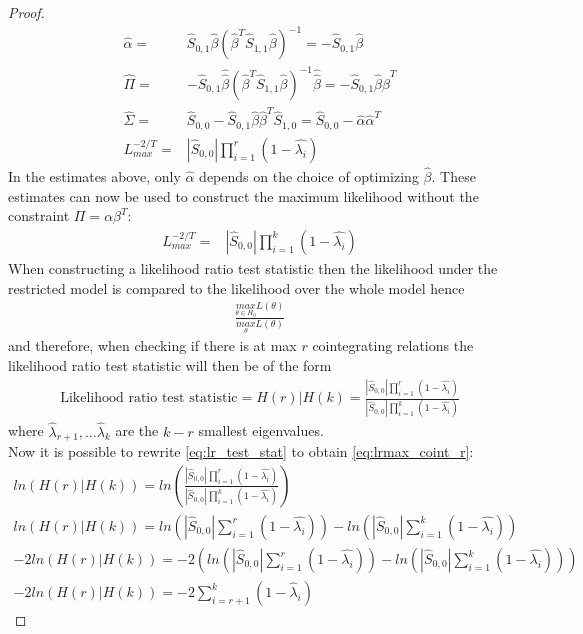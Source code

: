 \begin{proof}
\begin{align*}
    \hat{\alpha}=&\hat{S}_{0,1}\hat{\beta}(\hat{\beta}^T \hat{S}_{1,1}\hat{\beta})^{-1}=-\hat{S}_{0,1}\hat{\beta}\\
    \hat{\Pi}=&-\hat{S}_{0,1}\hat{\hat{\beta}}(\hat{\beta}^T \hat{S}_{1,1}\hat{\beta})^{-1}\hat{\hat{\beta}}=-\hat{S}_{0,1}\hat{\beta}\hat{\beta}^T\\
    \hat{\Sigma}=&\hat{S}_{0,0}-\hat{S}_{0,1}\hat{\beta}\hat{\beta}^T\hat{S}_{1,0}=\hat{S}_{0,0}-\hat{\alpha}\hat{\alpha}^T\\
    L_{max}^{-2/T}=&|\hat{S}_{0,0}|\prod_{i=1}^r(1-\hat{\lambda_i})
\end{align*}
In the estimates above, only $\hat{\alpha}$ depends on the choice of optimizing $\hat{\beta}$. These estimates can now be used to construct the maximum likelihood without the constraint $\Pi=\alpha\beta^T$:
\begin{align*}
    L_{max}^{-2/T}=&|\hat{S}_{0,0}|\prod_{i=1}^k(1-\hat{\lambda_i})
\end{align*}
When constructing a likelihood ratio test statistic then the likelihood under the restricted model is compared to the likelihood over the whole model hence
\begin{align*}
    \frac{\underset{\theta\in H_0}{max}L(\theta)}{\underset{\theta}{max}L(\theta)}
\end{align*}
and therefore, when checking if there is at max $r$ cointegrating relations the likelihood ratio test statistic will then be of the form
\begin{align}\label{eq:lr_test_stat}
\text{Likelihood ratio test statistic}=H(r)|H(k)=\frac{|\hat{S}_{0,0}|\prod_{i=1}^r (1-\hat{\lambda_i})}{|\hat{S}_{0,0}|\prod_{i=1}^k(1-\hat{\lambda_i})}
\end{align}
where $\hat{\lambda}_{r+1},\ldots\hat{\lambda}_k$ are the $k-r$ smallest eigenvalues.\\
Now it is possible to rewrite \eqref{eq:lr_test_stat} to obtain \eqref{eq:lrmax_coint_r}:
\begin{align*}
    ln(H(r)|H(k))=ln\left(\frac{|\hat{S}_{0,0}|\prod_{i=1}^r (1-\hat{\lambda_i})}{|\hat{S}_{0,0}|\prod_{i=1}^k(1-\hat{\lambda_i})}\right)\\
    ln(H(r)|H(k))=ln\left(|\hat{S}_{0,0}| \sum_{i=1}^r (1-\hat{\lambda_i})\right)-ln\left(|\hat{S}_{0,0}|\sum_{i=1}^k (1-\hat{\lambda_i})\right)\\
    -2ln(H(r)|H(k))=-2\left( ln\left(|\hat{S}_{0,0}| \sum_{i=1}^r (1-\hat{\lambda_i})\right)-ln\left(|\hat{S}_{0,0}|\sum_{i=1}^k (1-\hat{\lambda_i})\right)\right)\\
    -2ln(H(r)|H(k))=-2\sum_{i=r+1}^k(1-\hat{\lambda}_i)
\end{align*}

\end{proof} 




